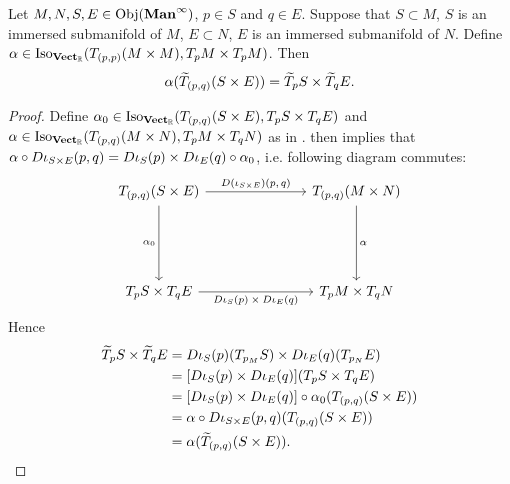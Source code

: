 \documentclass{book}
\begin{document}
\begin{ex} 
	Let $M, N, S, E \in \operatorname{Obj}(\operatorname*{\text{\textbf{Man}}^{\infty}})$, $p \in S$ and $q \in E$. Suppose that $S \subset M$, $S$ is an immersed submanifold of $M$, $E \subset N$, $E$ is an immersed submanifold of $N$. Define $\alpha \in \operatorname{Iso}_{\operatorname*{\text{\textbf{Vect}}_{\mathbb{R}}}}(T_{(p,p)}(M \times M), T_pM \times  T_pM)$. Then
	$$\alpha (\widetilde{T}_{(p, q)} (S \times E)) = \widetilde{T}_pS \times \widetilde{T}_qE. $$
\end{ex}

\begin{proof}
	Define $\alpha_0 \in \operatorname{Iso}_{\operatorname*{\text{\textbf{Vect}}_{\mathbb{R}}}}(T_{(p,q)}(S \times E), T_pS \times T_q E)$ and $\alpha \in \operatorname{Iso}_{\operatorname*{\text{\textbf{Vect}}_{\mathbb{R}}}}(T_{(p, q)} (M \times N), T_p M \times T_q N)$ as in .  then implies that $\alpha \circ D\iota_{S \times E}(p,q) = {D \iota_S(p) \times D \iota_E (q)} \circ \alpha_0$,
	i.e. following diagram commutes: 
	\[ 
	\begin{tikzcd}
		\text{$T_{(p, q)}(S \times E)$} \arrow[ddd, "\al_0"'] \arrow[rrr, "\text{$D(\iota_{S \times E})(p,q)$}"] &&&  \text{$T_{(p,q)}(M \times N)$} \arrow[ddd, "\al"] \\
		& \\
		& \\
		\text{$T_pS \times T_qE$} \arrow[rrr, "\text{$D\iota_S(p) \times D\iota_E(q)$}"'] &&&  \text{$T_p M \times T_q N$}
	\end{tikzcd}
	\]
	Hence 
	\begin{align*}
		\widetilde{T}_p S \times \widetilde{T}_q E
		& = D\iota_S(p)(T_{p_M}S) \times D\iota_E(q)(T_{p_N}E) \\
		& = [D\iota_S(p) \times D\iota_E(q)](T_p S \times T_q E) \\
		& = [D\iota_S(p) \times D\iota_E(q)] \circ \alpha_0 (T_{(p, q)} (S \times E)) \\
		& = \alpha \circ D \iota_{S \times E}(p, q) (T_{(p, q)} (S \times E)) \\
		& = \alpha (\widetilde{T}_{(p, q)} (S \times E)).
	\end{align*}
\end{proof}
\end{document}
